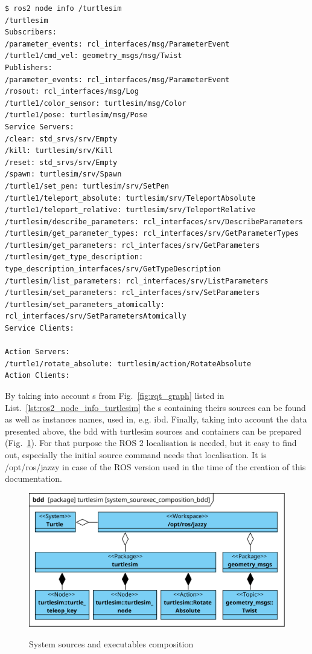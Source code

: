 \documentclass[11pt,oneside,a4paper]{report}
\begin{document}
\begin{lstlisting}[style=terminal,label={lst:ros2_node_info_turtlesim},caption={ros2 node info /turtlesim}]
$ ros2 node info /turtlesim 
/turtlesim
Subscribers:
/parameter_events: rcl_interfaces/msg/ParameterEvent
/turtle1/cmd_vel: geometry_msgs/msg/Twist
Publishers:
/parameter_events: rcl_interfaces/msg/ParameterEvent
/rosout: rcl_interfaces/msg/Log
/turtle1/color_sensor: turtlesim/msg/Color
/turtle1/pose: turtlesim/msg/Pose
Service Servers:
/clear: std_srvs/srv/Empty
/kill: turtlesim/srv/Kill
/reset: std_srvs/srv/Empty
/spawn: turtlesim/srv/Spawn
/turtle1/set_pen: turtlesim/srv/SetPen
/turtle1/teleport_absolute: turtlesim/srv/TeleportAbsolute
/turtle1/teleport_relative: turtlesim/srv/TeleportRelative
/turtlesim/describe_parameters: rcl_interfaces/srv/DescribeParameters
/turtlesim/get_parameter_types: rcl_interfaces/srv/GetParameterTypes
/turtlesim/get_parameters: rcl_interfaces/srv/GetParameters
/turtlesim/get_type_description: type_description_interfaces/srv/GetTypeDescription
/turtlesim/list_parameters: rcl_interfaces/srv/ListParameters
/turtlesim/set_parameters: rcl_interfaces/srv/SetParameters
/turtlesim/set_parameters_atomically: rcl_interfaces/srv/SetParametersAtomically
Service Clients:

Action Servers:
/turtle1/rotate_absolute: turtlesim/action/RotateAbsolute
Action Clients:
\end{lstlisting}

By taking into account \stRosConnection{}s from Fig.~\ref{fig:rqt_graph} listed in List.~\ref{lst:ros2_node_info_turtlesim} the \stPackage{}s containing theirs sources can be found as well as 
instances names, used in, e.g. ibd. Finally, taking into account the data presented above, the bdd with \textsf{turtlesim} \stSystem{} sources and containers can be prepared (Fig.~\ref{fig:system_sourexec_composition_bdd}). For that purpose the ROS 2 \stWorkspace{} localisation is needed, but it easy to find out, especially the initial \textsf{source} command needs that localisation. It is  \textsf{/opt/ros/jazzy} in case of the ROS version used in the time of the creation of this documentation.

\begin{figure}[H]
	\centering
	\begin{center}
		{\includegraphics[scale=1.0]{diagrams/system_sourexec_composition_bdd.png}}
	\end{center}
	\caption{System sources and executables composition}
	\label{fig:system_sourexec_composition_bdd}
\end{figure}
\end{document}
